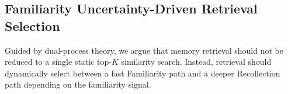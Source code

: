 


\subsection{Familiarity Uncertainty-Driven Retrieval Selection}
\label{sec:switch}
Guided by dual-process theory, we argue that memory retrieval should not be reduced to a single static top-$K$ similarity search. Instead, retrieval should dynamically select between a fast Familiarity path and a deeper Recollection path depending on the familiarity signal.

